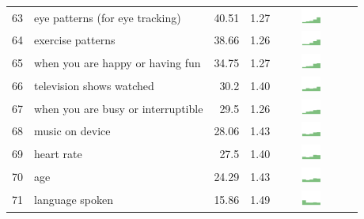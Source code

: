 \begin{table}[t]
\begin{center}
\begin{tabular}{| r | l | r | r | r | r |}
63 & eye patterns (for eye tracking) & 40.51 & 1.27 & \includegraphics[width = 2cm, height = 0.5cm]{tex-inputs/table-images/scannedyoureyetolearnyoureyepatterns(foreyetracking)combined} \\ 
64 & exercise patterns & 38.66 & 1.26 & \includegraphics[width = 2cm, height = 0.5cm]{tex-inputs/table-images/learnedwhenhowandhowmuchyouexercisecombined} \\ 
65 & when you are happy or having fun & 34.75 & 1.27 & \includegraphics[width = 2cm, height = 0.5cm]{tex-inputs/table-images/learnedwhenyouwerehappyorhavingfuncombined} \\ 
66 & television shows watched & 30.2 & 1.40 & \includegraphics[width = 2cm, height = 0.5cm]{tex-inputs/table-images/learnedwhattelevisionshowsyouwatchcombined} \\ 
67 & when you are busy or interruptible & 29.5 & 1.26 & \includegraphics[width = 2cm, height = 0.5cm]{tex-inputs/table-images/learnedwhenyouarebusyorinterruptiblecombined} \\ 
68 & music on device & 28.06 & 1.43 & \includegraphics[width = 2cm, height = 0.5cm]{tex-inputs/table-images/copiedanduploadedmusicfromyourdevicecombined} \\ 
69 & heart rate & 27.5 & 1.40 & \includegraphics[width = 2cm, height = 0.5cm]{tex-inputs/table-images/learnedyourheartratecombined} \\ 
70 & age & 24.29 & 1.43 &  \includegraphics[width = 2cm, height = 0.5cm]{tex-inputs/table-images/learnedyouragecombined} \\ 
71 & language spoken & 15.86 & 1.49 & \includegraphics[width = 2cm, height = 0.5cm]{tex-inputs/table-images/learnedthelanguageyouwerespeakingcombined} \\ 

\end{tabular}
\end{center}
\end{table}

